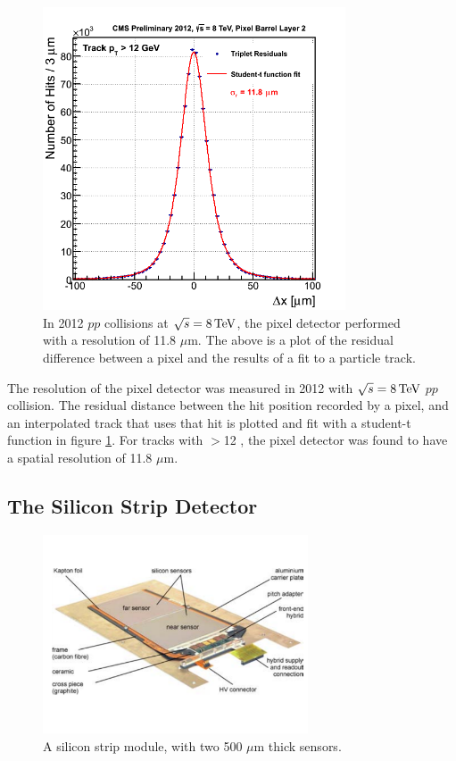 \begin{figure}[h]
   \centering
  \includegraphics[width=0.8\textwidth]{Figures/CMS_Diagrams/Tracker__Pixel_Resolution__2012_data.png}
  \caption{In 2012 $pp$ collisions at $\sqrt{s}=8 \,\text{Te\hspace{-.08em}V}$, the pixel
    detector performed with a resolution of 11.8 $\mu$m.  The above
    is a plot of the residual difference between a pixel and the
    results of a fit to a particle track.} \label{fig:tracker_pixel_resolution}
\end{figure}

\par The resolution of the pixel detector was measured in 2012 with
$\sqrt{s}=8 \,\text{Te\hspace{-.08em}V}$ $pp$ collision.  The residual distance between the
hit position recorded by a pixel, and an interpolated track that uses
that hit is plotted and fit with a student-t function in figure
\ref{fig:tracker_pixel_resolution}.  For tracks with \PT$>$12 \GeV, the
pixel detector was found to have a spatial resolution of 11.8 $\mu$m. 


\subsection{The Silicon Strip Detector}
\label{tracker_strip_description}

\begin{figure}[h]
   \centering
  \includegraphics[width=0.7\textwidth]{Figures/CMS_Diagrams/Tracker__Silicon_Strip_Module.pdf}
  \caption{A silicon strip module, with two 500 $\mu$m thick sensors.} \label{fig:tracker_strip_module}
\end{figure}

